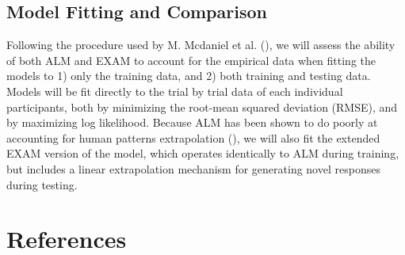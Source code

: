 \documentclass[
  letterpaper,
  DIV=11,
  numbers=noendperiod,
  oneside]{scrartcl}
\begin{document}
\newpage{}

\subsection{Model Fitting and
Comparison}\label{model-fitting-and-comparison}

Following the procedure used by M. Mcdaniel et al.
(), we
will assess the ability of both ALM and EXAM to account for the
empirical data when fitting the models to 1) only the training data, and
2) both training and testing data. Models will be fit directly to the
trial by trial data of each individual participants, both by minimizing
the root-mean squared deviation (RMSE), and by maximizing log
likelihood. Because ALM has been shown to do poorly at accounting for
human patterns extrapolation
(), we
will also fit the extended EXAM version of the model, which operates
identically to ALM during training, but includes a linear extrapolation
mechanism for generating novel responses during testing.

\section*{References}\label{references}
\end{document}
